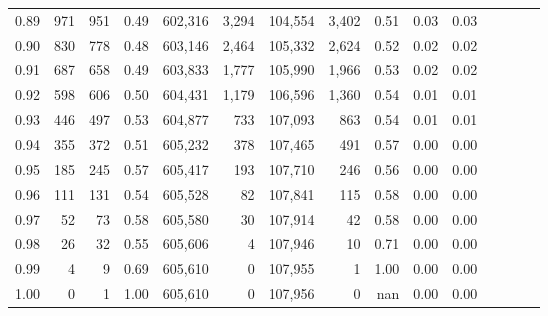 \begin{tabular}{rrrcrrrrrrrrrrr}
0.89 &     971 &    951 &                                       0.49 &  602,316 &    3,294 &  104,554 &    3,402 &  0.51 &  0.03 &                         0.03 \\
0.90 &     830 &    778 &                                       0.48 &  603,146 &    2,464 &  105,332 &    2,624 &  0.52 &  0.02 &                         0.02 \\
0.91 &     687 &    658 &                                       0.49 &  603,833 &    1,777 &  105,990 &    1,966 &  0.53 &  0.02 &                         0.02 \\
0.92 &     598 &    606 &                                       0.50 &  604,431 &    1,179 &  106,596 &    1,360 &  0.54 &  0.01 &                         0.01 \\
0.93 &     446 &    497 &                                       0.53 &  604,877 &      733 &  107,093 &      863 &  0.54 &  0.01 &                         0.01 \\
0.94 &     355 &    372 &                                       0.51 &  605,232 &      378 &  107,465 &      491 &  0.57 &  0.00 &                         0.00 \\
0.95 &     185 &    245 &                                       0.57 &  605,417 &      193 &  107,710 &      246 &  0.56 &  0.00 &                         0.00 \\
0.96 &     111 &    131 &                                       0.54 &  605,528 &       82 &  107,841 &      115 &  0.58 &  0.00 &                         0.00 \\
0.97 &      52 &     73 &                                       0.58 &  605,580 &       30 &  107,914 &       42 &  0.58 &  0.00 &                         0.00 \\
0.98 &      26 &     32 &                                       0.55 &  605,606 &        4 &  107,946 &       10 &  0.71 &  0.00 &                         0.00 \\
0.99 &       4 &      9 &                                       0.69 &  605,610 &        0 &  107,955 &        1 &  1.00 &  0.00 &                         0.00 \\
1.00 &       0 &      1 &                                       1.00 &  605,610 &        0 &  107,956 &        0 &   nan &  0.00 &                         0.00 \\
\bottomrule
\end{tabular}
